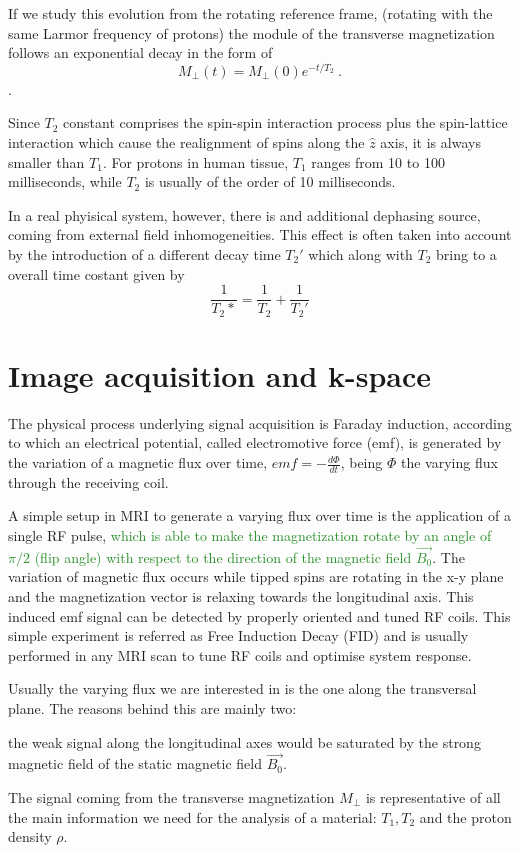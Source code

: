 \documentclass[11pt]{report}
\begin{document}
If we study this evolution from the rotating reference frame, (rotating with the same Larmor frequency of protons) the module of the transverse magnetization follows an exponential decay in the form of
\begin{equation}
M_\perp(t) = M_\perp(0) e^{-t/T_2} \ .
\end{equation}.

Since $T_2$ constant comprises the spin-spin interaction process plus the spin-lattice interaction which cause the realignment of spins along the $\hat z$ axis, it is always smaller than $T_1$.
For protons in human tissue, $T_1$ ranges from 10 to 100 milliseconds, while $T_2$ is usually of the order of 10 milliseconds.


In a real phyisical system, however, there is and additional dephasing source, coming from external field inhomogeneities.
This effect is often taken into account by the introduction of a different decay time $T_2'$ which along with $T_2$ bring to a overall time costant given by
\begin{equation}
\frac{1}{T_2*} = \frac{1}{T_2}+\frac{1}{T_2'}
\end{equation}


\section{Image acquisition and k-space}

The physical process underlying signal acquisition is Faraday induction, according to which an electrical potential, called electromotive force (emf), is generated by the variation of a magnetic flux over time, $emf = -\frac{d\Phi}{dt}$, being $\Phi$ the varying flux through the receiving coil.

A simple setup in MRI to generate a varying flux over time is the application of a single RF pulse, \textcolor{ForestGreen}{which is able to make the magnetization rotate by an angle of $\pi/2$ (flip angle) with respect to the direction of the magnetic field $\vec{B_0}$}.
The variation of magnetic flux occurs while tipped spins are rotating in the x-y plane and the magnetization vector is relaxing towards the longitudinal axis.
This induced emf signal can be detected by properly oriented and tuned RF coils.
This simple experiment is referred as Free Induction Decay (FID) and is usually performed in any MRI scan to tune RF coils and optimise system response.

Usually the varying flux we are interested in is the one along the transversal plane.
The reasons behind this are mainly two:
\begin{enumerate*}
\item the weak signal along the longitudinal axes would be saturated by the strong magnetic field of the static magnetic field $ \vec{B_0}$.
\item The signal coming from the transverse magnetization $M_\perp$ is representative of all the main information we need for the analysis of a material: $T_1, T_2$ and the proton density $\rho$.
\end{enumerate*}
\end{document}
